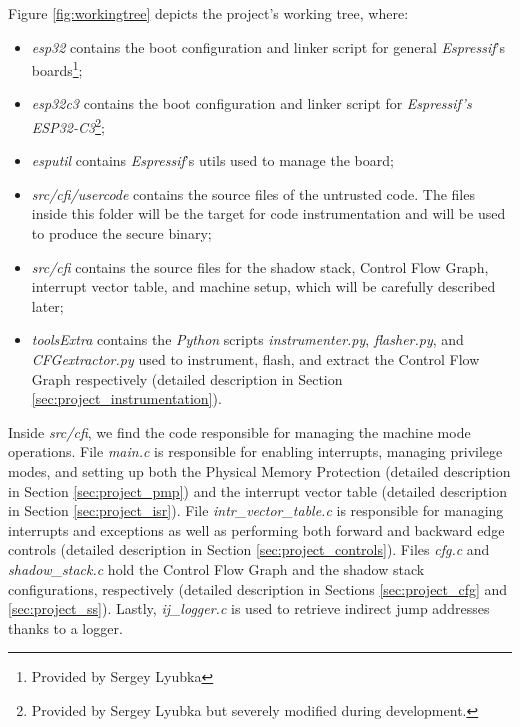 Figure \ref{fig:workingtree} depicts the project's working tree, where:

\begin{itemize}
  \item \textit{esp32} contains the boot configuration and linker script for
    general \textit{Espressif}'s boards\footnote{Provided by Sergey Lyubka};

  \item \textit{esp32c3} contains the boot configuration and linker script for
    \textit{Espressif's ESP32-C3}\footnote{Provided by Sergey Lyubka but
    severely modified during development.};

  \item \textit{esputil} contains \textit{Espressif}'s utils used to manage the board;

  \item \textit{src/cfi/usercode} contains the source files of the untrusted
    code. The files inside this folder will be the target for code instrumentation
    and will be used to produce the secure binary;

  \item \textit{src/cfi} contains the source files for the shadow stack, Control
    Flow Graph, interrupt vector table, and machine setup, which will be
    carefully described later;

  \item \textit{toolsExtra} contains the \textit{Python} scripts \textit{instrumenter.py},
    \textit{flasher.py}, and \textit{CFGextractor.py} used to instrument, flash,
    and extract the Control Flow Graph respectively (detailed description in Section
    \ref{sec:project_instrumentation}).
\end{itemize}

Inside \textit{src/cfi}, we find the code responsible for managing the machine
mode operations. File \textit{main.c} is responsible for enabling interrupts, managing
privilege modes, and setting up both the Physical Memory Protection (detailed description
in Section \ref{sec:project_pmp}) and the interrupt vector table (detailed description
in Section \ref{sec:project_isr}). File \textit{intr\_vector\_table.c} is
responsible for managing interrupts and exceptions as well as performing both
forward and backward edge controls (detailed description in Section \ref{sec:project_controls}).
Files \textit{cfg.c} and \textit{shadow\_stack.c} hold the Control Flow Graph and
the shadow stack configurations, respectively (detailed description in Sections \ref{sec:project_cfg}
and \ref{sec:project_ss}). Lastly, \textit{ij\_logger.c} is used to retrieve indirect
jump addresses thanks to a logger.


